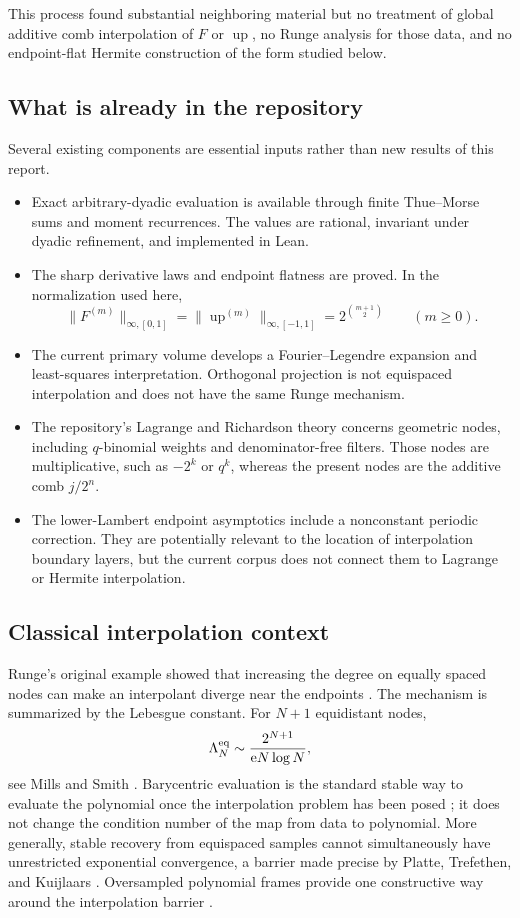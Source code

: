\documentclass[11pt,oneside]{article}
\theoremstyle{definition}
\theoremstyle{remark}
\newcommand{\Up}{\operatorname{up}}
\newcommand{\e}{\mathrm e}
\begin{document}
This process found substantial neighboring material but no treatment of global additive
comb interpolation of $F$ or $\Up$, no Runge analysis for those data, and no endpoint-flat
Hermite construction of the form studied below.

\subsection{What is already in the repository}

Several existing components are essential inputs rather than new results of this report.

\begin{itemize}
\item Exact arbitrary-dyadic evaluation is available through finite Thue--Morse sums and
moment recurrences.  The values are rational, invariant under dyadic refinement, and
implemented in Lean.
\item The sharp derivative laws and endpoint flatness are proved.  In the normalization used
here,
\[
 \|F^{(m)}\|_{\infty,[0,1]}=\|\Up^{(m)}\|_{\infty,[-1,1]}
 =2^{\binom{m+1}{2}}\qquad(m\ge0).
\]
\item The current primary volume develops a Fourier--Legendre expansion and least-squares
interpretation.  Orthogonal projection is not equispaced interpolation and does not have the
same Runge mechanism.
\item The repository's Lagrange and Richardson theory concerns geometric nodes, including
$q$-binomial weights and denominator-free filters.  Those nodes are multiplicative, such as
$-2^k$ or $q^k$, whereas the present nodes are the additive comb $j/2^n$.
\item The lower-Lambert endpoint asymptotics include a nonconstant periodic correction.  They
are potentially relevant to the location of interpolation boundary layers, but the current
corpus does not connect them to Lagrange or Hermite interpolation.
\end{itemize}

\subsection{Classical interpolation context}

Runge's original example showed that increasing the degree on equally spaced nodes can make
an interpolant diverge near the endpoints \cite{runge1901}.  The mechanism is summarized by
the Lebesgue constant.  For $N+1$ equidistant nodes,
\begin{equation}
 \Lambda_N^{\rm eq}
 \sim \frac{2^{N+1}}{\e N\log N},
 \label{eq:classical-lebesgue}
\end{equation}
see Mills and Smith \cite{mills1992}.  Barycentric evaluation is the standard stable way to
evaluate the polynomial once the interpolation problem has been posed
\cite{berrut2004}; it does not change the condition number of the map from data to
polynomial.  More generally, stable recovery from equispaced samples cannot simultaneously
have unrestricted exponential convergence, a barrier made precise by Platte, Trefethen,
and Kuijlaars \cite{platte2011}.  Oversampled polynomial frames provide one constructive
way around the interpolation barrier \cite{adcock2023}.
\end{document}
